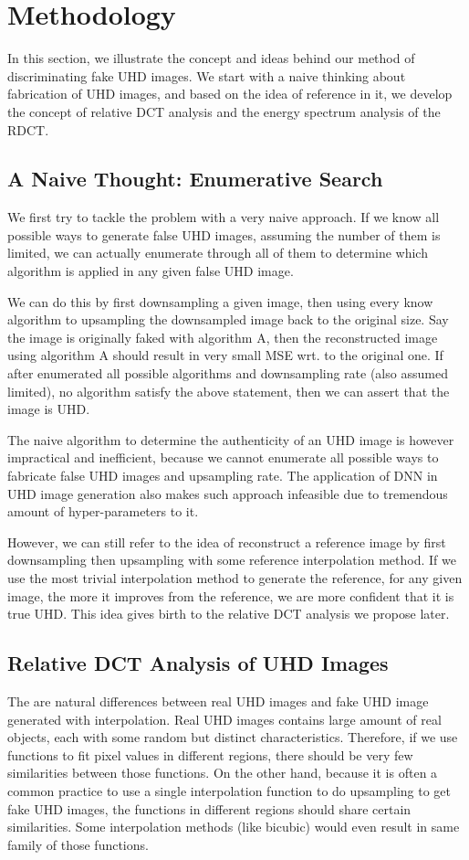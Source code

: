 \documentclass[journal,conference]{IEEEtran}
\begin{document}
\section{Methodology}
In this section, we illustrate the concept and ideas behind our method of discriminating fake UHD images.
We start with a naive thinking about fabrication of UHD images, and based on the idea of reference in it, we develop the concept of relative DCT analysis and the energy spectrum analysis of the RDCT.


\subsection{A Naive Thought: Enumerative Search}
\label{sec:enumerative}
We first try to tackle the problem with a very naive approach.
If we know all possible ways to generate false UHD images, assuming the number of them is limited, we can actually enumerate through all of them to determine which algorithm is applied in any given false UHD image.

We can do this by first downsampling a given image, then using every know algorithm to upsampling the downsampled image back to the original size.
Say the image is originally faked with algorithm A, then the reconstructed image using algorithm A should result in very small MSE wrt. to the original one.
If after enumerated all possible algorithms and downsampling rate (also assumed limited), no algorithm satisfy the above statement, then we can assert that the image is UHD.

The naive algorithm to determine the authenticity of an UHD image is however impractical and inefficient, because we cannot enumerate all possible ways to fabricate false UHD images and upsampling rate.
The application of DNN in UHD image generation also makes such approach infeasible due to tremendous amount of hyper-parameters to it.

However, we can still refer to the idea of reconstruct a reference image by first downsampling then upsampling with some reference interpolation method.
If we use the most trivial interpolation method to generate the reference, for any given image, the more it improves from the reference, we are more confident that it is true UHD.
This idea gives birth to the relative DCT analysis we propose later.

\subsection{Relative DCT Analysis of UHD Images}
The are natural differences between real UHD images and fake UHD image generated with interpolation.
Real UHD images contains large amount of real objects, each with some random but distinct characteristics.
Therefore, if we use functions to fit pixel values in different regions, there should be very few similarities between those functions.
On the other hand, because it is often a common practice to use a single interpolation function to do upsampling to get fake UHD images, the functions in different regions should share certain similarities.
Some interpolation methods (like bicubic) would even result in same family of those functions.
\end{document}
